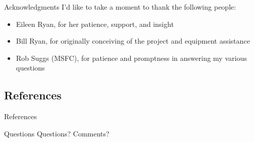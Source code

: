 \documentclass[pdf]{beamer}
\begin{document}
 \begin{frame}{Acknowledgments}
   I'd like to take a moment to thank the following people:
   \begin{itemize}
	 \item Eileen Ryan, for her patience, support, and insight
	 \item Bill Ryan, for originally conceiving of the project and equipment assistance
	 \item Rob Suggs (MSFC), for patience and promptness in answering my various questions
   \end{itemize}
 \end{frame}


 \subsection{References}
 \begin{frame}[allowframebreaks]{References}
   \def\newblock{}
   \nocite{Brown2002,Halliday1996,Stuart2001,Rabinowitz2000}
   \tiny{}
 \end{frame}

 \begin{frame}{Questions}
   Questions? Comments?
 \end{frame}

 \appendix
\end{document}

